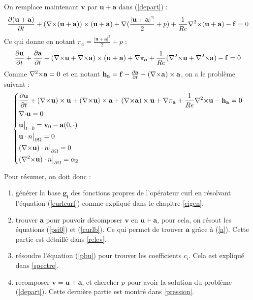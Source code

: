 On remplace maintenant $\mathbf{v}$ par $\mathbf{u}+\mathbf{a}$ dans (\ref{depart}) :
\[
\frac{\partial(\mathbf{u}+\mathbf{a})}{\partial t}+({\nabla\times}(\mathbf{u}+\mathbf{a}))\times(\mathbf{u}+\mathbf{a}) + {\nabla} (\frac{|\mathbf{u}+\mathbf{a}|^2}{2}+p) + \frac{1}{Re}{\nabla^2\times}(\mathbf{u}+\mathbf{a}) - \mathbf{f} = 0
\]
Ce qui donne en notant $\pi_a=\frac{|\mathbf{u}+\mathbf{a}|^2}{2}+p$ :
\[
\frac{\partial \mathbf{u}}{\partial t}+\frac{\partial \mathbf{a}}{\partial t} + ({\nabla\times} \mathbf{u}+{\nabla\times} \mathbf{a})\times(\mathbf{u}+\mathbf{a}) + {\nabla}\pi_{\mathbf{a}} + \frac{1}{Re}({\nabla^2\times} \mathbf{u}+{\nabla^2\times} \mathbf{a}) - \mathbf{f} = 0
\]
Comme ${\nabla^2\times} \mathbf{a} = 0$ et en notant $\mathbf{h_a}=\mathbf{f}-\frac{\partial \mathbf{a}}{\partial t} - ({\nabla\times} \mathbf{a})\times \mathbf{a}$, on a le problème suivant :
\begin{equation}
\label{pbu}
\left\{
\begin{aligned}
&\frac{\partial \mathbf{u}}{\partial t} + ({\nabla\times} \mathbf{u})\times \mathbf{u} + ({\nabla\times} \mathbf{u})\times \mathbf{a} +({\nabla\times} \mathbf{a})\times \mathbf{u} + {\nabla} \pi_{\mathbf{a}} +\frac{1}{Re}{\nabla^2\times}  \mathbf{u} - \mathbf{h_a} = 0\\
&{\nabla\cdot} \mathbf{u} = 0\\
&\mathbf{u}\big\rvert_{t=0} = \mathbf{v}_0 - \mathbf{a}(0,\cdot)\\
&\mathbf{u}\cdot n{\big\rvert_{\partial\Omega}} = 0\\
&({\nabla\times} \mathbf{u})\cdot n{\big\rvert_{\partial\Omega}} = 0\\
&({\nabla^2\times}  \mathbf{u})\cdot n{\big\rvert_{\partial\Omega}} = \alpha_2
\end{aligned}
\right.
\end{equation}

Pour résumer, on doit donc :
\begin{enumerate}
\item générer la base $\mathbf{g_i}$ des fonctions propres de l'opérateur curl en résolvant l'équation (\ref{curlcurl}) comme expliqué dans le chapitre \ref{eigen}.
\item trouver $\mathbf{a}$ pour pouvoir décomposer $\mathbf{v}$ en $\mathbf{u}+\mathbf{a}$, pour cela, on résout les équations (\ref{psi0}) et (\ref{curlb}). Ce qui permet de trouver $\mathbf{a}$ grâce à (\ref{a}). Cette partie est détaillé dans \ref{relev}.
\item résoudre l'équation (\ref{pbu}) pour trouver les coefficients $c_i$. Cela est expliqué dans \ref{spectre}.
\item recomposer $\mathbf{v}=\mathbf{u}+\mathbf{a}$, et chercher $p$ pour avoir la solution du problème (\ref{depart}). Cette dernière partie est montré dans \ref{pression}.
\end{enumerate}

